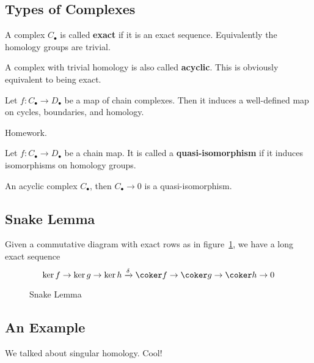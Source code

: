 \documentclass[12pt]{article}
\begin{document}
\subsection{Types of Complexes}
\begin{defn}
	A complex $C_\bullet$ is called \textbf{exact} if it is an exact sequence. Equivalently the 
	homology groups are trivial.
\end{defn}
\begin{rmk}
	A complex with trivial homology is also called \textbf{acyclic}. This is obviously equivalent to being 
	exact.
\end{rmk}
\begin{lem}
	Let $f:C_\bullet\to D_\bullet$ be a map of chain complexes. Then it induces a well-defined map on 
	cycles, boundaries, and homology.
\end{lem}
\begin{prf}
	Homework.
\end{prf}

\begin{defn}
	Let $f:C_\bullet\to D_\bullet$ be a chain map. It is called a \textbf{quasi-isomorphism}
	if it induces isomorphisms on homology groups.
\end{defn}
\begin{rmk}
	An acyclic complex $C_\bullet$, then $C_\bullet\to 0$ is a quasi-isomorphism.
\end{rmk}
\subsection{Snake Lemma}
\begin{lem}[Snake]
	Given a commutative diagram with exact rows as in figure~\ref{fig-snake},
	we have a long exact sequence
	\[\ker f\to \ker g\to \ker h\xrightarrow{\delta} \coker f\to \coker g\to \coker h\to 0\]
\end{lem}
\begin{figure}[h!]\label{fig-snake}
	\centering
	\caption{Snake Lemma}
\end{figure}

\subsection{An Example}
We talked about singular homology. Cool!
\end{document}
